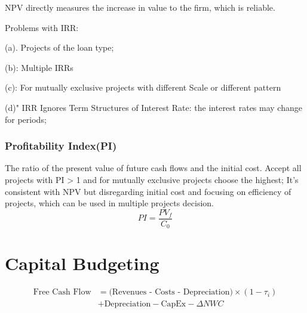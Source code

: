 \documentclass[10pt, a4paper]{article}
\begin{document}
                NPV directly measures the increase in value to the firm, which is reliable. 

                Problems with IRR: 

                \quad(a). Projects of the loan type; 

                \quad(b): Multiple IRRs
                
                \quad(c):  For mutually exclusive projects with different Scale or different pattern

                \quad(d)" IRR Ignores Term Structures of Interest Rate: the interest rates may change for periods;
            \subsubsection{Profitability Index(PI)}
                The ratio of the present value of future cash flows and the initial cost. Accept all projects with PI > 1 and for mutually exclusive projects choose the highest; It's consistent with NPV but disregarding initial cost and focusing on efficiency of projects, which can be used in multiple projects decision. 
                $$PI = \frac{PV_f}{C_0}$$
\newpage
    \section{Capital Budgeting}
            $$\begin{aligned}
                \text{Free Cash Flow} &=
            \text{(Revenues - Costs - Depreciation)} \times (1 - \tau_i) \\
            &+ \text{Depreciation} - \text{CapEx} - \Delta NWC
            \end{aligned}$$
\end{document}
